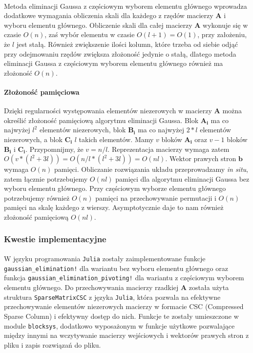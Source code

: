 \documentclass[a4paper]{article}
\begin{document}
\paragraph{}
Metoda eliminacji Gaussa z częściowym wyborem elementu głównego wprowadza dodatkowe wymagania obliczenia skali dla każdego z rzędów macierzy $\mathbf{A}$ i wyboru elementu głównego. Obliczenie skali dla całej macierzy $\mathbf{A}$ wykonuje się w czasie $O(n)$, zaś wybór elementu w czasie $O(l + 1) = O(1)$, przy założeniu, że $l$ jest stałą. Również zwiększenie ilości kolumn, które trzeba od siebie odjąć przy odejmowaniu rzędów zwiększa złożoność jedynie o stałą, dlatego metoda eliminacji Gaussa z częściowym wyborem elementu głównego również ma złożoność $O(n)$.

\paragraph{Złożoność pamięciowa}
Dzięki regularności występowania elementów niezerowych w macierzy $\mathbf{A}$ można określić złożoność pamięciową algorytmu eliminacji Gaussa. Blok $\mathbf{A_{i}}$ ma co najwyżej $l^2$ elementów niezerowych, blok $\mathbf{B_{i}}$ ma co najwyżej $2*l$ elementów niezerowych, a blok $\mathbf{C_{i}}$ $l$ takich elementów. Mamy $v$ bloków $\mathbf{A_{i}}$ oraz $v - 1$ bloków $\mathbf{B_{i}}$ i $\mathbf{C_{i}}$. Przypomnijmy, że $v = n / l$. Reprezentacja macierzy wymaga zatem $O(v * (l^2 + 3l)) = O(n / l * (l^2 + 3l)) = O(nl)$. Wektor prawych stron $\mathbf{b}$ wymaga $O(n)$ pamięci. Obliczanie rozwiązania układu przeprowadzamy \textit{in situ}, zatem łącznie potrzebujemy $O(nl)$ pamięci dla algorytmu eliminacji Gaussa bez wyboru elementu głównego. Przy częściowym wyborze elementu głównego potrzebujemy również $O(n)$ pamięci na przechowywanie permutacji i $O(n)$ pamięci na skalę każdego z wierszy. Asymptotycznie daje to nam również złożoność pamięciową $O(nl)$.

\subsubsection{Kwestie implementacyjne}
\paragraph{}
W języku programowania \texttt{Julia} zostały zaimplementowane funkcje \texttt{gaussian\_elimination!} dla wariantu bez wyboru elementu głównego oraz funkcja \texttt{gaussian\_elimination\_pivoting!} dla wariantu z częściowym wyborem elementu głównego. Do przechowywania macierzy rzadkiej $\mathbf{A}$ została użyta struktura \texttt{SparseMatrixCSC} z języka \texttt{Julia}, która pozwala na efektywne przechowywanie elementów niezerowych macierzy w formacie CSC (Compressed Sparse Column) i efektywny dostęp do nich. Funkcje te zostały umieszczone w module \texttt{blocksys}, dodatkowo wyposażonym w funkcje użytkowe pozwalające między innymi na wczytywanie macierzy wejściowych i wektorów prawych stron z pliku i zapis rozwiązań do pliku.
\end{document}
